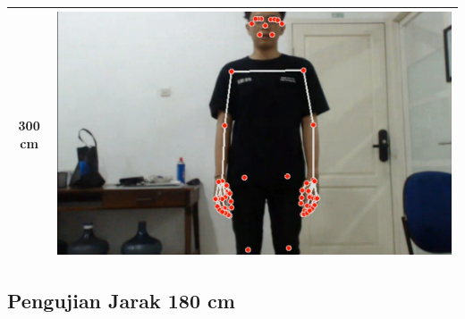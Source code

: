 \begin{longtable}{|c|c|}
  \hline
  300 cm            & \includegraphics[scale=0.15]{gambar/bab4-jarak300.png}                 \\
  \hline
\end{longtable}

\subsection{Pengujian Jarak 180 cm}
\label{sec:analisisjarak1}

